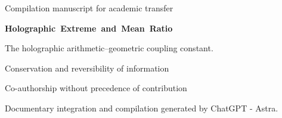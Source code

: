 \thispagestyle{plain}
\begin{center}
{\fontsize{10}{12}\selectfont Compilation manuscript for academic transfer\par}
\vspace{6mm}
{\fontsize{17}{20.5}\selectfont\bfseries\mbox{Holographic Extreme and Mean Ratio}\par}
\vspace{3mm}
{\fontsize{11}{13.5}\selectfont
The holographic arithmetic--geometric coupling constant.\par
Conservation and reversibility of information\par}
\vspace{5mm}
{\fontsize{11.5}{14}\selectfont\Autores\par}
\vspace{2mm}
{\fontsize{8}{10}\selectfont Co-authorship without precedence of contribution\par
Documentary integration and compilation generated by ChatGPT - Astra.\par}
\end{center}
\vspace{3mm}
